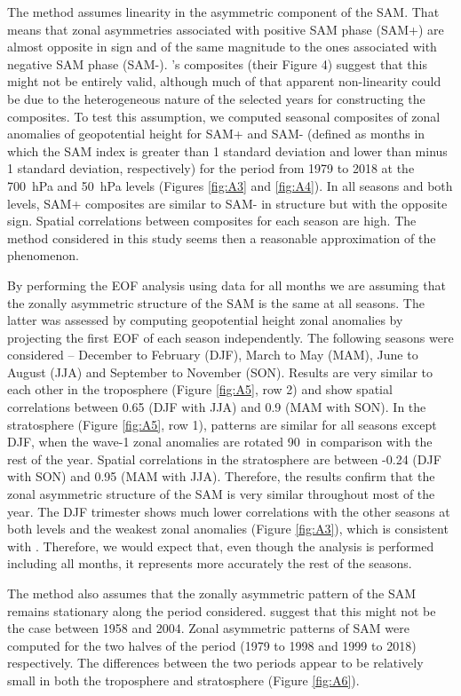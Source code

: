 \documentclass[smallextended]{svjour3}       %
\begin{document}
The method assumes linearity in the asymmetric component of the SAM.
That means that zonal asymmetries associated with positive SAM phase (SAM+) are almost opposite in sign and of the same magnitude to the ones associated with negative SAM phase (SAM-).
\citet{fogt2012}'s composites (their Figure 4) suggest that this might not be entirely valid, although much of that apparent non-linearity could be due to the heterogeneous nature of the selected years for constructing the composites.
To test this assumption, we computed seasonal composites of zonal anomalies of geopotential height for SAM+ and SAM- (defined as months in which the SAM index is greater than 1 standard deviation and lower than minus 1 standard deviation, respectively) for the period from 1979 to 2018 at the 700~hPa and 50~hPa levels (Figures \ref{fig:A3} and \ref{fig:A4}).
In all seasons and both levels, SAM+ composites are similar to SAM- in structure but with the opposite sign.
Spatial correlations between composites for each season are high.
The method considered in this study seems then a reasonable approximation of the phenomenon.

By performing the EOF analysis using data for all months we are assuming that the zonally asymmetric structure of the SAM is the same at all seasons.
The latter was assessed by computing geopotential height zonal anomalies by projecting the first EOF of each season independently.
The following seasons were considered -- December to February (DJF), March to May (MAM), June to August (JJA) and September to November (SON).
Results are very similar to each other in the troposphere (Figure \ref{fig:A5}, row 2) and show spatial correlations between 0.65 (DJF with JJA) and 0.9 (MAM with SON).
In the stratosphere (Figure \ref{fig:A5}, row 1), patterns are similar for all seasons except DJF, when the wave-1 zonal anomalies are rotated 90\degree~in comparison with the rest of the year.
Spatial correlations in the stratosphere are between -0.24 (DJF with SON) and 0.95 (MAM with JJA).
Therefore, the results confirm that the zonal asymmetric structure of the SAM is very similar throughout most of the year.
The DJF trimester shows much lower correlations with the other seasons at both levels and the weakest zonal anomalies (Figure \ref{fig:A3}), which is consistent with \citet{fogt2020}.
Therefore, we would expect that, even though the analysis is performed including all months, it represents more accurately the rest of the seasons.

The method also assumes that the zonally asymmetric pattern of the SAM remains stationary along the period considered.
\citet{silvestri2009} suggest that this might not be the case between 1958 and 2004.
Zonal asymmetric patterns of SAM were computed for the two halves of the period (1979 to 1998 and 1999 to 2018) respectively.
The differences between the two periods appear to be relatively small in both the troposphere and stratosphere (Figure \ref{fig:A6}).
\end{document}
